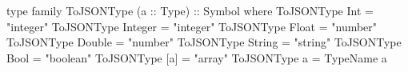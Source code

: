 \begin{code}
type family ToJSONType (a :: Type) :: Symbol where
  ToJSONType Int     = "integer"
  ToJSONType Integer = "integer"
  ToJSONType Float   = "number"
  ToJSONType Double  = "number"
  ToJSONType String  = "string"
  ToJSONType Bool    = "boolean"
  ToJSONType [a]     = "array"
  ToJSONType a       = TypeName a
\end{code}

